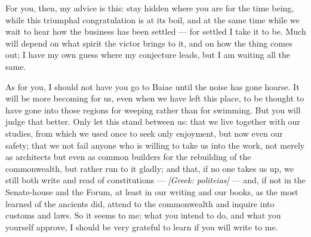  For you, then, my advice is this: stay hidden where you are for the time being, while this triumphal congratulation is at its boil, and at the same time while we wait to hear how the business has been settled --- for settled I take it to be. Much will depend on what spirit the victor brings to it, and on how the thing comes out; I have my own guess where my conjecture leads, but I am waiting all the same.

 As for you, I should not have you go to Baiae until the noise has gone hoarse. It will be more becoming for us, even when we have left this place, to be thought to have gone into those regions for weeping rather than for swimming. But you will judge that better. Only let this stand between us: that we live together with our studies, from which we used once to seek only enjoyment, but now even our safety; that we not fail anyone who is willing to take us into the work, not merely as architects but even as common builders for the rebuilding of the commonwealth, but rather run to it gladly; and that, if no one takes us up, we still both write and read of constitutions --- \textit{[Greek: politeias]} --- and, if not in the Senate-house and the Forum, at least in our writing and our books, as the most learned of the ancients did, attend to the commonwealth and inquire into customs and laws. So it seems to me; what you intend to do, and what you yourself approve, I should be very grateful to learn if you will write to me.
